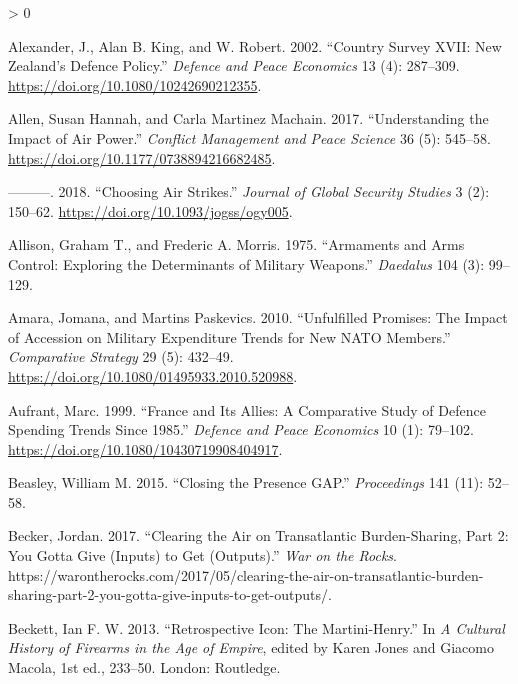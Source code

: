 \documentclass[
]{article}
\newlength{\cslhangindent}
\newenvironment{CSLReferences}[2] %
 {%
  \setlength{\parindent}{0pt}
  \ifodd #1 \everypar{\setlength{\hangindent}{\cslhangindent}}\ignorespaces\fi
  \ifnum #2 > 0
  \setlength{\parskip}{#2\baselineskip}
  \fi
 }%
 {}
\begin{document}
\hypertarget{refs}{}
\begin{CSLReferences}{1}{0}
\leavevmode\hypertarget{ref-alexander_countrysurveyxvii_2002}{}%
Alexander, J., Alan B. King, and W. Robert. 2002. {``Country Survey {XVII}: {New} Zealand's Defence Policy.''} \emph{Defence and Peace Economics} 13 (4): 287--309. \url{https://doi.org/10.1080/10242690212355}.

\leavevmode\hypertarget{ref-allen_understandingimpactair_2017}{}%
Allen, Susan Hannah, and Carla Martinez Machain. 2017. {``Understanding the Impact of Air Power.''} \emph{Conflict Management and Peace Science} 36 (5): 545--58. \url{https://doi.org/10.1177/0738894216682485}.

\leavevmode\hypertarget{ref-allen_choosingairstrikes_2018}{}%
---------. 2018. {``Choosing {Air Strikes}.''} \emph{Journal of Global Security Studies} 3 (2): 150--62. \url{https://doi.org/10.1093/jogss/ogy005}.

\leavevmode\hypertarget{ref-allison_armamentsarmscontrol_1975}{}%
Allison, Graham T., and Frederic A. Morris. 1975. {``Armaments and {Arms Control}: {Exploring} the {Determinants} of {Military Weapons}.''} \emph{Daedalus} 104 (3): 99--129.

\leavevmode\hypertarget{ref-amara_unfulfilledpromisesimpact_2010}{}%
Amara, Jomana, and Martins Paskevics. 2010. {``Unfulfilled {Promises}: {The Impact} of {Accession} on {Military Expenditure Trends} for {New NATO Members}.''} \emph{Comparative Strategy} 29 (5): 432--49. \url{https://doi.org/10.1080/01495933.2010.520988}.

\leavevmode\hypertarget{ref-aufrant_franceitsallies_1999}{}%
Aufrant, Marc. 1999. {``France and Its Allies: {A} Comparative Study of Defence Spending Trends Since 1985.''} \emph{Defence and Peace Economics} 10 (1): 79--102. \url{https://doi.org/10.1080/10430719908404917}.

\leavevmode\hypertarget{ref-beasley_closingpresencegap_2015}{}%
Beasley, William M. 2015. {``Closing the {Presence GAP}.''} \emph{Proceedings} 141 (11): 52--58.

\leavevmode\hypertarget{ref-becker_clearingairtransatlantic_2017}{}%
Becker, Jordan. 2017. {``Clearing the {Air} on {Transatlantic Burden-Sharing}, {Part} 2: {You Gotta Give} ({Inputs}) to {Get} ({Outputs}).''} \emph{War on the Rocks}. https://warontherocks.com/2017/05/clearing-the-air-on-transatlantic-burden-sharing-part-2-you-gotta-give-inputs-to-get-outputs/.

\leavevmode\hypertarget{ref-beckett_retrospectiveiconmartinihenry_2013}{}%
Beckett, Ian F. W. 2013. {``Retrospective {Icon}: {The Martini-Henry}.''} In \emph{A {Cultural History} of {Firearms} in the {Age} of {Empire}}, edited by Karen Jones and Giacomo Macola, 1st ed., 233--50. {London}: {Routledge}.


\end{CSLReferences}
\end{document}

